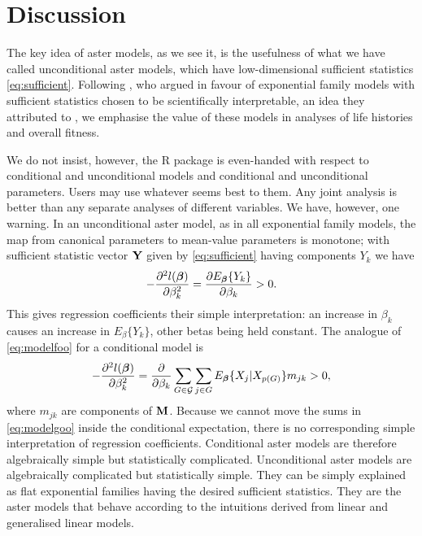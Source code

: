\section{Discussion}

The key idea of aster models, as we see it, is the usefulness of
what we have called unconditional aster models, which have
low-dimensional sufficient statistics \eqref{eq:sufficient}.
Following \citet{gat}, who argued in favour of exponential family
models with sufficient statistics chosen to be
scientifically interpretable, an idea they attributed to \citet{jaynes},
we emphasise the value of these models in analyses of life histories
and overall fitness.

We do not insist, however, the R package \verb@aster@ is even-handed
with respect to conditional and unconditional models and conditional
and unconditional parameters.  Users may use whatever seems best to them.
Any joint analysis is better than any separate
analyses of different variables.
We have, however, one warning.
In an unconditional aster model,
as in all exponential family models, the map from canonical
parameters to mean-value parameters is monotone;
with sufficient statistic vector $\mathbf{Y}$ given by \eqref{eq:sufficient}
having components $Y_k$ we have
\begin{equation}
\label{eq:modelfoo}
   - \frac{\partial^2 l({\boldsymbol{\beta}})}{\partial \beta_k^2}
   =
   \frac{\partial E_{\boldsymbol{\beta}} \{ Y_k \}}{\partial \beta_k}
   >
   0.
\end{equation}
This gives regression coefficients
their simple interpretation: an increase in $\beta_k$ causes an increase
in $E_\beta \{ Y_k \}$, other betas being held constant.
The analogue of \eqref{eq:modelfoo} for a conditional model is
\begin{equation}
\label{eq:modelgoo}
   - \frac{\partial^2 l({\boldsymbol{\beta}})}{\partial \beta_k^2}
   =
   \frac{\partial}{\partial \beta_k}
   \sum_{G \in \mathcal{G}}
   \sum_{j \in G}
   E_{\boldsymbol{\beta}} \{ X_j | X_{p(G)} \}
   m_{j k} > 0,
\end{equation}
where $m_{j k}$ are components of $\mathbf{M}$.
Because we cannot move the sums in \eqref{eq:modelgoo}
inside the conditional expectation,
there is no corresponding simple interpretation of regression coefficients.
Conditional aster models are therefore algebraically simple but
statistically complicated.
Unconditional aster models are algebraically complicated but statistically
simple.  They can be simply explained as flat
exponential families having the desired sufficient statistics.  They are
the aster models that behave according to the intuitions derived
from linear and generalised linear models.

